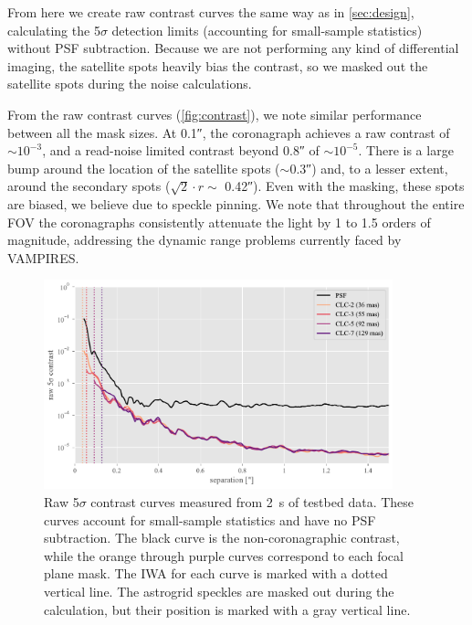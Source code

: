 \documentclass[]{spie}  %
\begin{document}
From here we create raw contrast curves the same way as in \autoref{sec:design}, calculating the 5$\sigma$ detection limits (accounting for small-sample statistics) without PSF subtraction. Because we are not performing any kind of differential imaging, the satellite spots heavily bias the contrast, so we masked out the satellite spots during the noise calculations.

From the raw contrast curves (\autoref{fig:contrast}), we note similar performance between all the mask sizes. At \ang{;;0.1}, the coronagraph achieves a raw contrast of $\sim 10^{-3}$, and a read-noise limited contrast beyond \ang{;;0.8} of $\sim10^{-5}$. There is a large bump around the location of the satellite spots ($\sim$\ang{;;0.3}) and, to a lesser extent, around the secondary spots ($\sqrt{2}\cdot r \sim$ \ang{;;0.42}). Even with the masking, these spots are biased, we believe due to speckle pinning\cite{bloemhof2004}. We note that throughout the entire FOV the coronagraphs consistently attenuate the light by 1 to 1.5 orders of magnitude, addressing the dynamic range problems currently faced by VAMPIRES.


\begin{figure}
   \centering
   \includegraphics[width=0.9\textwidth]{figures/bench_20220526_curves}
   \caption{Raw 5$\sigma$ contrast curves measured from \qty{2}{\second} of testbed data. These curves account for small-sample statistics and have no PSF subtraction. The black curve is the non-coronagraphic contrast, while the orange through purple curves correspond to each focal plane mask. The IWA for each curve is marked with a dotted vertical line. The astrogrid speckles are masked out during the calculation, but their position is marked with a gray vertical line.}\label{fig:contrast}
\end{figure}
\end{document}
